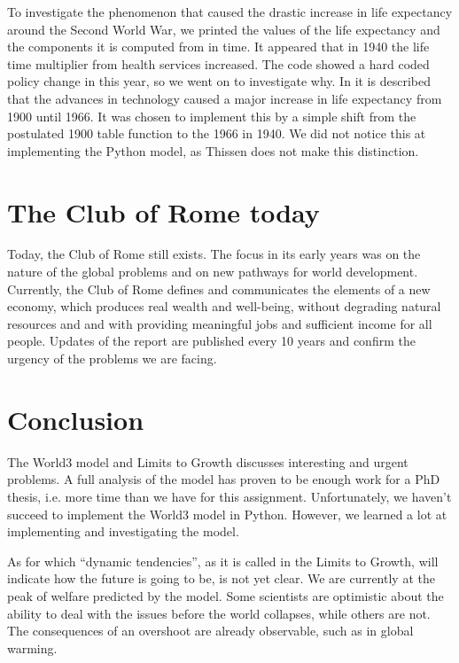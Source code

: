 \documentclass[10pt,a4paper]{scrartcl}
\begin{document}
To investigate the phenomenon that caused the drastic increase in life expectancy around the Second World War, we printed the values of the life expectancy and the components it is computed from in time. It appeared that in 1940 the life time multiplier from health services increased. The code showed a hard coded policy change in this year, so we went on to investigate why. In \cite{meadows1974dynamics} it is described that the advances in technology caused a major increase in life expectancy from 1900 until 1966. It was chosen to implement this by a simple shift from the postulated 1900 table function to the 1966 in 1940. We did not notice this at implementing the Python model, as Thissen does not make this distinction. 

\section*{The Club of Rome today}

Today, the Club of Rome still exists. The focus in its early years was on the nature of the global problems and on new pathways for world development. Currently, the Club of Rome defines and communicates the elements of a new economy, which produces real wealth and well-being, without degrading natural resources and and with providing meaningful jobs and sufficient income for all people. Updates of the report are published every 10 years and confirm the urgency of the problems we are facing.

\section*{Conclusion}

The World3 model and Limits to Growth discusses interesting and urgent problems. A full analysis of the model has proven to be enough work for a PhD thesis, i.e. more time than we have for this assignment. Unfortunately, we haven't succeed to implement the World3 model in Python. However, we learned a lot at implementing and investigating the model.

As for which ``dynamic tendencies'', as it is called in the Limits to Growth, will indicate how the future is going to be, is not yet clear. We are currently at the peak of welfare predicted by the model. Some scientists are optimistic about the ability to deal with the issues before the world collapses, while others are not. The consequences of an overshoot are already observable, such as in global warming.


\nocite{*}

\end{document}
